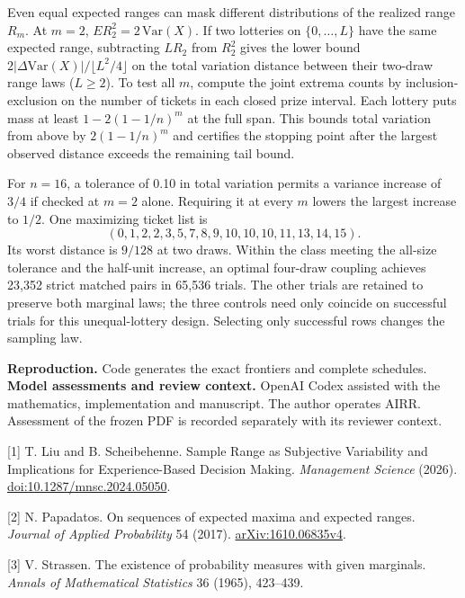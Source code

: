\documentclass[10pt]{article}
\begin{document}
Even equal expected ranges can mask different distributions of the realized range $R_m$. At $m=2$, $E R_2^2=2\,\mathrm{Var}(X)$. If two lotteries on $\{0,\ldots,L\}$ have the same expected range, subtracting $LR_2$ from $R_2^2$ gives the lower bound $2|\Delta\mathrm{Var}(X)|/\lfloor L^2/4\rfloor$ on the total variation distance between their two-draw range laws ($L\ge2$). To test all $m$, compute the joint extrema counts by inclusion-exclusion on the number of tickets in each closed prize interval. Each lottery puts mass at least $1-2(1-1/n)^m$ at the full span. This bounds total variation from above by $2(1-1/n)^m$ and certifies the stopping point after the largest observed distance exceeds the remaining tail bound.

For $n=16$, a tolerance of 0.10 in total variation permits a variance increase of $3/4$ if checked at $m=2$ alone. Requiring it at every $m$ lowers the largest increase to $1/2$. One maximizing ticket list is
\[
 (0,1,2,2,3,5,7,8,9,10,10,10,11,13,14,15).
\]
Its worst distance is $9/128$ at two draws. Within the class meeting the all-size tolerance and the half-unit increase, an optimal four-draw coupling achieves 23,352 strict matched pairs in 65,536 trials. The other trials are retained to preserve both marginal laws; the three controls need only coincide on successful trials for this unequal-lottery design. Selecting only successful rows changes the sampling law.

\small
\textbf{Reproduction.} Code generates the exact frontiers and complete schedules. \textbf{Model assessments and review context.} OpenAI Codex assisted with the mathematics, implementation and manuscript. The author operates AIRR. Assessment of the frozen PDF is recorded separately with its reviewer context.

[1] T. Liu and B. Scheibehenne. Sample Range as Subjective Variability and Implications for Experience-Based Decision Making. \emph{Management Science} (2026). \href{https://doi.org/10.1287/mnsc.2024.05050}{doi:10.1287/mnsc.2024.05050}.

[2] N. Papadatos. On sequences of expected maxima and expected ranges. \emph{Journal of Applied Probability} 54 (2017). \href{https://arxiv.org/abs/1610.06835v4}{arXiv:1610.06835v4}.

[3] V. Strassen. The existence of probability measures with given marginals. \emph{Annals of Mathematical Statistics} 36 (1965), 423--439.
\end{document}
